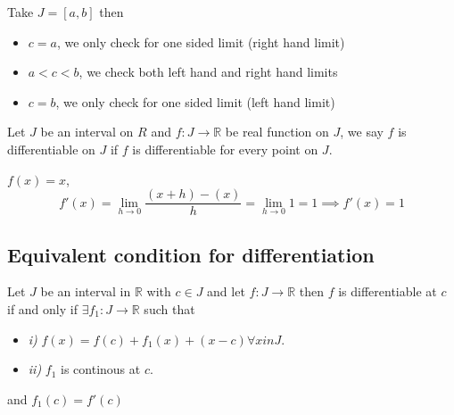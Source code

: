 \documentclass[11pt,a4paper]{colorart}
\def\R{\mathbb{R}}
\def\ra{\rightarrow}
\begin{document}
\begin{remark}
	Take $J = [a,b]$ then
	\begin{itemize}
		\item $c=a$, we only check for one sided limit (right hand limit)
		\item $a<c<b$, we check both left hand and right hand limits
		\item $c=b$, we only check for one sided limit (left hand limit)
	\end{itemize}
\end{remark}

\begin{definition}
	Let $J$ be an interval on $R$ and $f:J \ra \R$ be real function on $J$, we say $f$ is differentiable on $J$ if $f$ is differentiable for every point on $J$.
\end{definition}

\begin{example}
	$f(x) = x$, 
	\[ f'(x) = \lim_{h \to 0} \frac{ (x+h) - (x) }{ h} 
	   = \lim_{h \to 0} 1 = 1 \implies f'(x) = 1 \]
\end{example}

\subsection{Equivalent condition for differentiation}

\begin{theorem}
	Let $J$ be an interval in $\R$ with $c \in J$ and let $f:J \ra \R$ then $f$ is differentiable at $c$ if and only if $\exists f_1:J \ra \R$ such that
	\begin{itemize}
		\item \textit{i)} $f(x) = f(c) + f_1(x) + (x-c) \forall x in J$.
		\item \textit{ii)} $f_1$ is continous at $c$.
	\end{itemize}
	and $f_1(c) = f'(c)$
\end{theorem}
\end{document}
